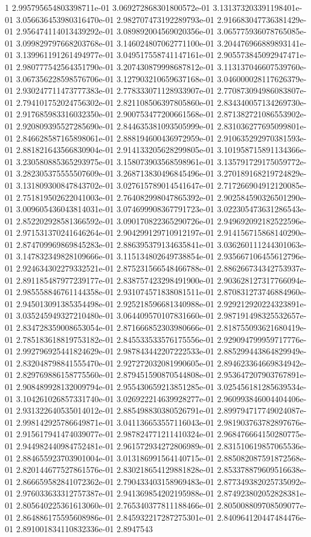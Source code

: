 1	2.995795654803398711e-01	3.069272868301800572e-01	3.131373203391198401e-01	3.056636453980316470e-01	2.982707473192289793e-01	2.916683047736381429e-01	2.956474114013439292e-01	3.089892004569020356e-01	3.065775936078765085e-01	3.099829797668203768e-01	3.146024807062771100e-01	3.204476966889893141e-01	3.139961191261494977e-01	3.049517558741147161e-01	2.905573845092947471e-01	2.980777542564351790e-01	3.207430879998687812e-01	3.113137046607539760e-01	3.067356228598576706e-01	3.127903210659637168e-01	3.046000028117626379e-01	2.930247711473777383e-01	2.778333071128933907e-01	2.770873094986083807e-01	2.794101752024756302e-01	2.821108506397805860e-01	2.834340057134269730e-01	2.917685983316032350e-01	2.900753477200661568e-01	2.871382721086553902e-01	2.920809395527285690e-01	2.844635381093505999e-01	2.831036277695099801e-01	2.846628587165898061e-01	2.888194600436972959e-01	2.910635292970381593e-01	2.881821643566830904e-01	2.914133205628299805e-01	3.101958715891134366e-01	3.230580885365293975e-01	3.158073903568598961e-01	3.135791729175059772e-01	3.282305375555507609e-01	3.268713830496845496e-01	3.270189168219724829e-01	3.131809300847843702e-01	3.027615789014541647e-01	2.717266904912120085e-01	2.751819502622041003e-01	2.764082998047865392e-01	2.902584590326501290e-01	3.009605436043814031e-01	3.074699908367791723e-01	3.022305473631286543e-01	2.852202928581366592e-01	3.090170822365290726e-01	2.949692092182522596e-01	2.971531370241646264e-01	2.904299129710912197e-01	2.914156715868140290e-01	2.874709969869845283e-01	2.886395379134635841e-01	3.036260111244301063e-01	3.147832349828109666e-01	3.115134802649738854e-01	2.935667106455612796e-01	2.924634302279332521e-01	2.875231566548466788e-01	2.886266734342753937e-01	2.891185487977239177e-01	2.838757423298491900e-01	2.903628127317766094e-01	2.985558846761144358e-01	2.931074571838081511e-01	2.870831273746884960e-01	2.945013091385354498e-01	2.925218596681340988e-01	2.929212920224323891e-01	3.035245949327210480e-01	3.064409570107831660e-01	2.987191498325532657e-01	2.834728359008653054e-01	2.871666852303980666e-01	2.818755093621680419e-01	2.785183618819753182e-01	2.845533533576175556e-01	2.929094799959717776e-01	2.992796925441824629e-01	2.987843442207222533e-01	2.885299443864829949e-01	2.832048798841555470e-01	2.927272032081990605e-01	2.894623364669834942e-01	2.829769886158775560e-01	2.879451590870544808e-01	2.953647207903767891e-01	2.908489928132009794e-01	2.955430659213851285e-01	3.025456181285639534e-01	3.104261026857331740e-01	3.026922214639928277e-01	2.960993846004404406e-01	2.931322640535014012e-01	2.885498830380526791e-01	2.899794717749024087e-01	2.998142925786649871e-01	3.041136653557116043e-01	2.981903763782897676e-01	2.915617941474039077e-01	2.987824771211410324e-01	2.968476664150280775e-01	2.944982440984752481e-01	2.961572934272806989e-01	2.831510619857065536e-01	2.884655923703901004e-01	3.013186991564140715e-01	2.885082087591872568e-01	2.820144677527861576e-01	2.830218654129881828e-01	2.853378879609516638e-01	2.866659582841072362e-01	2.790433403158969483e-01	2.877349382025735092e-01	2.976033633312757387e-01	2.941369854202195988e-01	2.874923802052828381e-01	2.805640225361613060e-01	2.765340377811188466e-01	2.805008809708509077e-01	2.864886175595608986e-01	2.845932217287275301e-01	2.840964120447484476e-01	2.891001834110832336e-01	2.8947543